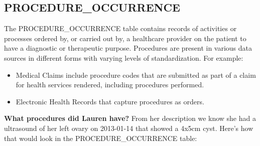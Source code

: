 \documentclass[]{book}
\providecommand{\tightlist}{%
  \setlength{\itemsep}{0pt}\setlength{\parskip}{0pt}}
\begin{document}
\subsection{PROCEDURE\_OCCURRENCE}\label{procedureOccurrence}

The PROCEDURE\_OCCURRENCE table contains records of activities or
processes ordered by, or carried out by, a healthcare provider on the
patient to have a diagnostic or therapeutic purpose. Procedures are
present in various data sources in different forms with varying levels
of standardization. For example:

\begin{itemize}
\tightlist
\item
  Medical Claims include procedure codes that are submitted as part of a
  claim for health services rendered, including procedures performed.
\item
  Electronic Health Records that capture procedures as orders.
\end{itemize}

\textbf{What procedures did Lauren have?} From her description we know
she had a ultrasound of her left ovary on 2013-01-14 that showed a 4x5cm
cyst. Here's how that would look in the PROCEDURE\_OCCURRENCE table:
\end{document}

